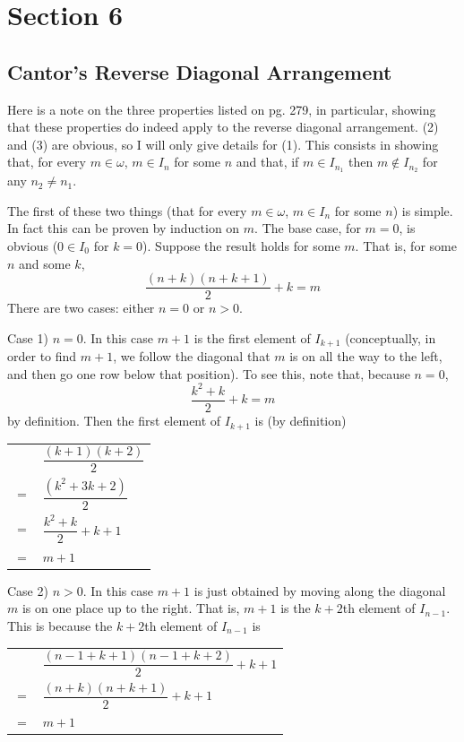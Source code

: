 \documentclass{article}
\theoremstyle{definition}
\begin{document}
\section*{Section 6}

\subsection*{Cantor's Reverse Diagonal Arrangement}
Here is a note on the three properties listed on pg. 279, in particular, showing that these properties 
do indeed apply to the reverse diagonal arrangement. (2) and (3) are obvious, so I will only give details 
for (1). This consists in showing that, for every $m\in\omega$, 
$m\in I_n$ for some $n$ and that, if $m\in I_{n_1}$ then $m\notin I_{n_2}$ for any $n_2\ne n_1$.

The first of these two things (that for every $m\in\omega$, $m\in I_n$ for some $n$) is simple. In fact this can 
be proven by induction on $m$. The base case, for $m=0$, is obvious ($0\in I_0$ for $k=0$). Suppose the result holds for 
some $m$. That is, for some $n$ and some $k$,
\[ \dfrac{(n+k)(n+k+1)}{2}+k=m \]
There are two cases: either $n=0$ or $n>0$.

Case 1) $n=0$. In this case $m+1$ is the first element of $I_{k+1}$ (conceptually, in order to find $m+1$, we follow the diagonal that 
$m$ is on all the way to the left, and then go one row below that position). To see this, note that, because $n=0$,
\[ \dfrac{k^2+k}{2}+k=m \] by definition. Then the first element of $I_{k+1}$ is (by definition)
\begin{center}
\begin{tabular}{ll}
    & $\dfrac{(k+1)(k+2)}{2}$ \\
$=$ & $\dfrac{(k^2+3k+2)}{2}$ \\
$=$ & $\dfrac{k^2+k}{2}+k+1$ \\
$=$ & $m+1$
\end{tabular}
\end{center}

Case 2) $n>0$. In this case $m+1$ is just obtained by moving along the diagonal $m$ is on one place up to the right. That is, 
$m+1$ is the $k+2$th element of $I_{n-1}$. This is because the $k+2$th element of $I_{n-1}$ is
\begin{center}
\begin{tabular}{ll}
    & $\dfrac{(n-1+k+1)(n-1+k+2)}{2}+k+1$ \\
$=$ & $\dfrac{(n+k)(n+k+1)}{2}+k+1$ \\
$=$ & $m+1$
\end{tabular}
\end{center}
\end{document}
